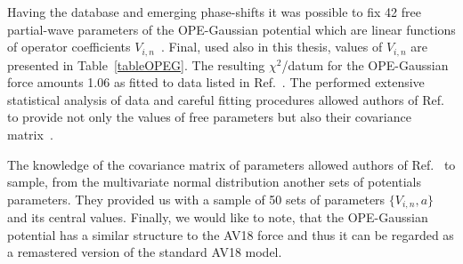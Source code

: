 \begin{enumerate}
Having the database and emerging phase-shifts it was possible to fix 42 free partial-wave parameters of the OPE-Gaussian potential which are linear functions of operator coefficients $V_{i, n}$~\cite{NavarroPerez2014}. Final, used also in this thesis, values of $V_{i,n}$ are presented in Table~\ref{tableOPEG}. The resulting $\chi^{2}$/datum for the OPE-Gaussian force amounts 1.06 as fitted to data listed in Ref.~\cite{Perez2013}. The performed extensive statistical analysis of data and careful fitting procedures allowed authors of Ref.~\cite{Perez2014} to provide not only the values of free parameters but also their covariance matrix~\cite{Perez2014}. 
\end{enumerate}
The knowledge of the covariance matrix of parameters allowed authors of Ref.~\cite{Perez2014} to sample, from the multivariate normal distribution another sets of potentials parameters. They provided us with a sample of 50 sets of parameters $\lbrace V_ {i, n}, a\rbrace$ and its central values. Finally, we would like to note, that the OPE-Gaussian potential has a similar structure to the AV18 force and thus it can be regarded as a remastered version of the standard AV18 model. 


